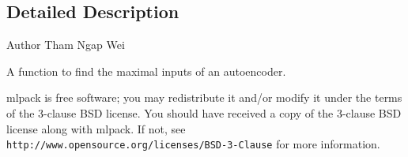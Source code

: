 \subsection{Detailed Description}
\begin{DoxyAuthor}{Author}
Tham Ngap Wei
\end{DoxyAuthor}
A function to find the maximal inputs of an autoencoder.

mlpack is free software; you may redistribute it and/or modify it under the terms of the 3-\/clause B\+SD license. You should have received a copy of the 3-\/clause B\+SD license along with mlpack. If not, see {\tt http\+://www.\+opensource.\+org/licenses/\+B\+S\+D-\/3-\/\+Clause} for more information. 